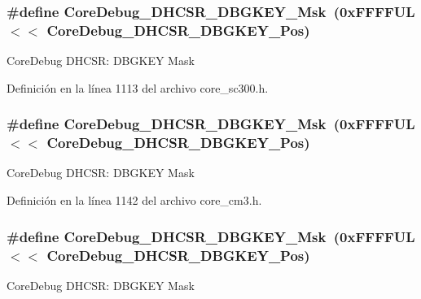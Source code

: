 \subsubsection[{\texorpdfstring{Core\+Debug\+\_\+\+D\+H\+C\+S\+R\+\_\+\+D\+B\+G\+K\+E\+Y\+\_\+\+Msk}{CoreDebug_DHCSR_DBGKEY_Msk}}]{\setlength{\rightskip}{0pt plus 5cm}\#define Core\+Debug\+\_\+\+D\+H\+C\+S\+R\+\_\+\+D\+B\+G\+K\+E\+Y\+\_\+\+Msk~(0x\+F\+F\+F\+F\+U\+L $<$$<$ Core\+Debug\+\_\+\+D\+H\+C\+S\+R\+\_\+\+D\+B\+G\+K\+E\+Y\+\_\+\+Pos)}\hypertarget{group___c_m_s_i_s___core_debug_ga1ce997cee15edaafe4aed77751816ffc}{}\label{group___c_m_s_i_s___core_debug_ga1ce997cee15edaafe4aed77751816ffc}
Core\+Debug D\+H\+C\+SR\+: D\+B\+G\+K\+EY Mask 

Definición en la línea 1113 del archivo core\+\_\+sc300.\+h.

\subsubsection[{\texorpdfstring{Core\+Debug\+\_\+\+D\+H\+C\+S\+R\+\_\+\+D\+B\+G\+K\+E\+Y\+\_\+\+Msk}{CoreDebug_DHCSR_DBGKEY_Msk}}]{\setlength{\rightskip}{0pt plus 5cm}\#define Core\+Debug\+\_\+\+D\+H\+C\+S\+R\+\_\+\+D\+B\+G\+K\+E\+Y\+\_\+\+Msk~(0x\+F\+F\+F\+F\+U\+L $<$$<$ Core\+Debug\+\_\+\+D\+H\+C\+S\+R\+\_\+\+D\+B\+G\+K\+E\+Y\+\_\+\+Pos)}\hypertarget{group___c_m_s_i_s___core_debug_ga1ce997cee15edaafe4aed77751816ffc}{}\label{group___c_m_s_i_s___core_debug_ga1ce997cee15edaafe4aed77751816ffc}
Core\+Debug D\+H\+C\+SR\+: D\+B\+G\+K\+EY Mask 

Definición en la línea 1142 del archivo core\+\_\+cm3.\+h.

\subsubsection[{\texorpdfstring{Core\+Debug\+\_\+\+D\+H\+C\+S\+R\+\_\+\+D\+B\+G\+K\+E\+Y\+\_\+\+Msk}{CoreDebug_DHCSR_DBGKEY_Msk}}]{\setlength{\rightskip}{0pt plus 5cm}\#define Core\+Debug\+\_\+\+D\+H\+C\+S\+R\+\_\+\+D\+B\+G\+K\+E\+Y\+\_\+\+Msk~(0x\+F\+F\+F\+F\+U\+L $<$$<$ Core\+Debug\+\_\+\+D\+H\+C\+S\+R\+\_\+\+D\+B\+G\+K\+E\+Y\+\_\+\+Pos)}\hypertarget{group___c_m_s_i_s___core_debug_ga1ce997cee15edaafe4aed77751816ffc}{}\label{group___c_m_s_i_s___core_debug_ga1ce997cee15edaafe4aed77751816ffc}
Core\+Debug D\+H\+C\+SR\+: D\+B\+G\+K\+EY Mask 

